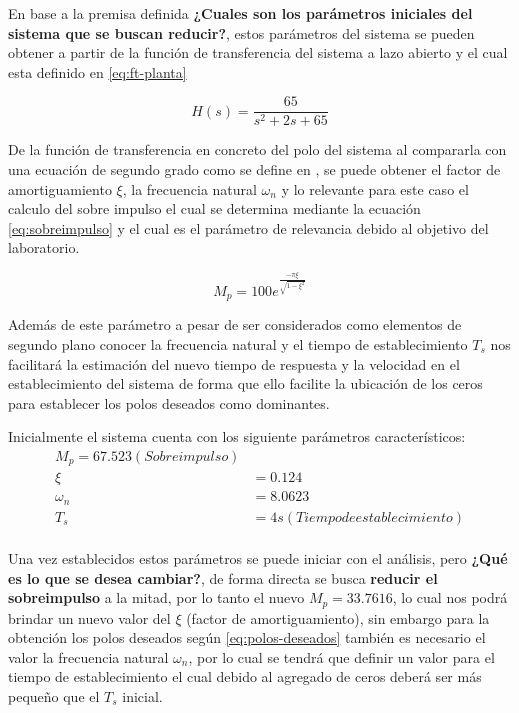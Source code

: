 \documentclass[conference]{IEEEtran}
\begin{document}
	En base a la premisa definida \textbf{¿Cuales son los parámetros iniciales del sistema que se buscan reducir?}, estos parámetros del sistema se pueden obtener a partir de la función de transferencia del sistema a lazo abierto y el cual esta definido en \ref{eq:ft-planta}
	
	\begin{equation}
		H(s) = \frac{65}{s^2 + 2s + 65}
		\label{eq:ft-planta}
	\end{equation}
	
	De la función de transferencia en concreto del polo del sistema al compararla con una ecuación de segundo grado como se define en \cite{ogata2015}, se puede obtener el factor de amortiguamiento $\xi$, la frecuencia natural $\omega_n$ y lo relevante para este caso el calculo del sobre impulso el cual se determina mediante la ecuación \ref{eq:sobreimpulso} y el cual es el parámetro de relevancia debido al objetivo del laboratorio.
	
	\begin{equation}
		M_p = 100e^{\frac{-\pi \xi}{\sqrt{1-\xi^2}}} 
		\label{eq:sobreimpulso}
	\end{equation}
	
	Además de este parámetro a pesar de ser considerados como elementos de segundo plano conocer la frecuencia natural y el tiempo de establecimiento $T_s$ nos facilitará la estimación del nuevo tiempo de respuesta y la velocidad en el establecimiento del sistema de forma que ello facilite la ubicación de los ceros para establecer los polos deseados como dominantes.
	
	Inicialmente el sistema cuenta con los siguiente parámetros característicos:
	\begin{align}
		M_p = 67.523 (Sobreimpulso) \\
		\xi &= 0.124 \\
		\omega_n &= 8.0623 \\
		T_s &= 4s (Tiempo de establecimiento) \\
		\label{eq:ts-planta}
	\end{align}
	
	Una vez establecidos estos parámetros se puede iniciar con el análisis, pero \textbf{¿Qué es lo que se desea cambiar?}, de forma directa se busca \textbf{reducir el sobreimpulso} a la mitad, por lo tanto el nuevo $M_p = 33.7616$, lo cual nos podrá brindar un nuevo valor del $\xi$ (factor de amortiguamiento), sin embargo para la obtención los polos deseados según \ref{eq:polos-deseados} también es necesario el valor la frecuencia natural $\omega_n$, por lo cual se tendrá que definir un valor para el tiempo de establecimiento el cual debido al agregado de ceros deberá ser más pequeño que el $T_s$ inicial.
	
\end{document}
